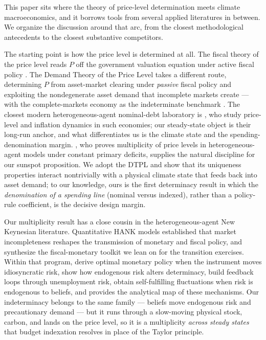 \documentclass[12pt]{article}
\begin{document}
This paper sits where the theory of price-level determination meets climate
macroeconomics, and it borrows tools from several applied literatures in
between. We organize the discussion around that arc, from the closest
methodological antecedents to the closest substantive competitors.

The starting point is how the price level is determined at all. The fiscal
theory of the price level reads $P$ off the government valuation equation under
active fiscal policy \citep{leeper1991,sims1994,woodford1995,cochrane2023}. The
Demand Theory of the Price Level \citep{hagedorn2026dtpl} takes a different
route, determining $P$ from asset-market clearing under \emph{passive} fiscal
policy and exploiting the nondegenerate asset demand that incomplete markets
create --- with the complete-markets economy as the indeterminate benchmark
\citep{sargentwallace1975}. The closest modern heterogeneous-agent nominal-debt
laboratory is \citet{kaplannikolakoudisviolante2023}, who study price-level and
inflation dynamics in such economies; our steady-state object is their long-run
anchor, and what differentiates us is the climate state and the
spending-denomination margin. \citet{hoefer2025}, who proves multiplicity of
price levels in heterogeneous-agent models under constant primary deficits,
supplies the natural discipline for our sunspot proposition. We adopt the DTPL
and show that its uniqueness properties interact nontrivially with a physical
climate state that feeds back into asset demand; to our knowledge, ours is the
first determinacy result in which the \emph{denomination of a spending line}
(nominal versus indexed), rather than a policy-rule coefficient, is the decisive
design margin.

Our multiplicity result has a close cousin in the heterogeneous-agent New
Keynesian literature. Quantitative HANK models \citep{kaplan2018,auclert2021}
established that market incompleteness reshapes the transmission of monetary and
fiscal policy, and \citet{auclertrognliestraub2025} synthesize the
fiscal-monetary toolkit we lean on for the transition exercises. Within that
program, \citet{acharya2023optimal} derive optimal monetary policy when the
instrument moves idiosyncratic risk, \citet{acharyadogra2020} show how
endogenous risk alters determinacy, \citet{ravnsterk2021} build feedback loops
through unemployment risk, \citet{acharyabenhabib2024} obtain self-fulfilling
fluctuations when risk is endogenous to beliefs, and \citet{bilbiie2024}
provides the analytical map of these mechanisms. Our indeterminacy belongs to
the same family --- beliefs move endogenous risk and precautionary demand ---
but it runs through a slow-moving physical stock, carbon, and lands on the
price level, so it is a multiplicity \emph{across steady states} that budget
indexation resolves in place of the Taylor principle.
\end{document}
